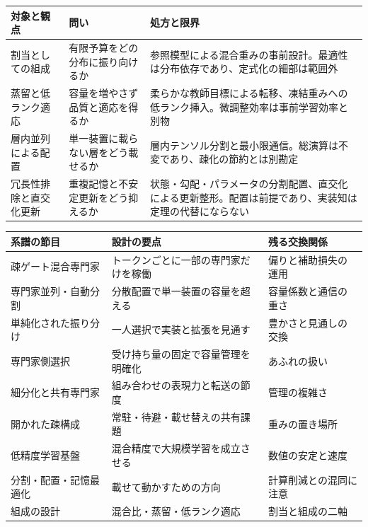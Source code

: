 \documentclass[lualatex,a4paper,10pt]{jlreq}
\begin{document}
\begin{center}
\small
\begin{tabularx}{\textwidth}{@{}p{}p{}X@{}}
\toprule
対象と観点 & 問い & 処方と限界 \\
\midrule
割当としての組成 & 有限予算をどの分布に振り向けるか & 参照模型による混合重みの事前設計\autocite{doremi}。最適性は分布依存であり、定式化の細部は範囲外 \\
蒸留と低ランク適応 & 容量を増やさず品質と適応を得るか & 柔らかな教師目標による転移\autocite{hinton2015}、凍結重みへの低ランク挿入\autocite{lora}。微調整効率は事前学習効率と別物 \\
層内並列による配置 & 単一装置に載らない層をどう載せるか & 層内テンソル分割と最小限通信\autocite{megatron}。総演算は不変であり、疎化の節約とは別勘定 \\
冗長性排除と直交化更新 & 重複記憶と不安定更新をどう抑えるか & 状態・勾配・パラメータの分割配置\autocite{zero}、直交化による更新整形\autocite{muon}。配置は前提であり、実装知は定理の代替にならない \\
\bottomrule
\end{tabularx}
\end{center}

\begin{center}
\small
\begin{tabularx}{\textwidth}{@{}p{}p{}X@{}}
\toprule
系譜の節目 & 設計の要点 & 残る交換関係 \\
\midrule
疎ゲート混合専門家 & トークンごとに一部の専門家だけを稼働 & 偏りと補助損失の運用 \\
専門家並列・自動分割 & 分散配置で単一装置の容量を超える & 容量係数と通信の重さ \\
単純化された振り分け & 一人選択で実装と拡張を見通す & 豊かさと見通しの交換 \\
専門家側選択 & 受け持ち量の固定で容量管理を明確化 & あふれの扱い \\
細分化と共有専門家 & 組み合わせの表現力と転送の節度 & 管理の複雑さ \\
開かれた疎構成 & 常駐・待避・載せ替えの共有課題 & 重みの置き場所 \\
低精度学習基盤 & 混合精度で大規模学習を成立させる & 数値の安定と速度 \\
分割・配置・記憶最適化 & 載せて動かすための方向 & 計算削減との混同に注意 \\
組成の設計 & 混合比・蒸留・低ランク適応 & 割当と組成の二軸 \\
\bottomrule
\end{tabularx}
\end{center}
\autocite{shazeer2017,gshard,switcht,deepseekmoe,deepseekv2,mixtral,deepseekv3}
\end{document}
